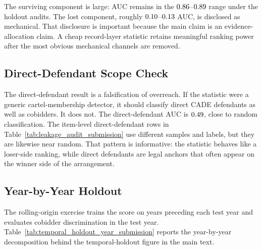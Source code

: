 The surviving component is large: AUC remains in the
$0.86$--$0.89$ range under the
holdout audits. The lost component, roughly
$0.10$--$0.13$ AUC, is disclosed as
mechanical. That disclosure is important because the main claim
is an evidence-allocation claim. A cheap record-layer statistic
retains meaningful ranking power after the most obvious
mechanical channels are removed.

\subsection{Direct-Defendant Scope Check}
\label{app:direct_scope_submission}

The direct-defendant result is a falsification of overreach. If
the statistic were a generic cartel-membership detector, it
should classify direct CADE defendants as well as cobidders. It
does not. The direct-defendant AUC is $0.49$, close
to random classification. The item-level direct-defendant rows
in Table~\ref{tab:leakage_audit_submission} use different
samples and labels, but they are likewise near random. That
pattern is informative: the
statistic behaves like a loser-side ranking, while direct
defendants are legal anchors that often appear on the winner side
of the arrangement.

\subsection{Year-by-Year Holdout}
\label{app:year_holdout_submission}

The rolling-origin exercise trains the score on years preceding
each test year and evaluates cobidder discrimination in the test
year. Table~\ref{tab:temporal_holdout_year_submission} reports the
year-by-year decomposition behind the temporal-holdout figure in
the main text.

